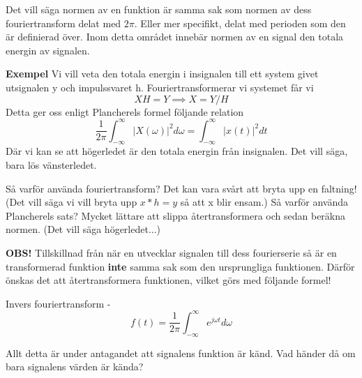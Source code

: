 \documentclass{article}
\begin{document}
Det vill säga normen av en funktion är samma sak som normen av dess fouriertransform delat med $2 \pi$. Eller mer specifikt, delat med perioden som den är definierad över. Inom detta området innebär normen av en signal den totala energin av signalen. %

\textbf{Exempel}
Vi vill veta den totala energin i insignalen till ett system givet utsignalen y och impulssvaret h. Fouriertransformerar vi systemet får vi 
\[XH = Y \implies X = Y/H\]
Detta ger oss enligt Plancherels formel följande relation
\[ \frac{1}{2 \pi} \int_{-\infty}^{\infty} |X(\omega)|^2 d \omega = \int_{-\infty}^{\infty} |x(t)|^2 d t \]
Där vi kan se att högerledet är den totala energin från insignalen. 
Det vill säga, bara lös vänsterledet. 

Så varför använda fouriertransform? Det kan vara svårt att bryta upp en faltning! (Det vill säga vi vill bryta upp $x*h=y$ så att x blir ensam.)
Så varför använda Plancherels sats? Mycket lättare att slippa återtransformera och sedan beräkna normen. (Det vill säga högerledet...)

\textbf{OBS!} Tillskillnad från när en utvecklar signalen till dess fourierserie så är en transformerad funktion \textbf{inte} samma sak som den ursprungliga funktionen. Därför önskas det att återtransformera funktionen, vilket görs med följande formel!

Invers fouriertransform - 
\[f(t) = \frac{1}{2 \pi} \int_{-\infty}^{\infty}  e^{j \omega t} d\omega \]

Allt detta är under antagandet att signalens funktion är känd. Vad händer då om bara signalens värden är kända?

\end{document}
